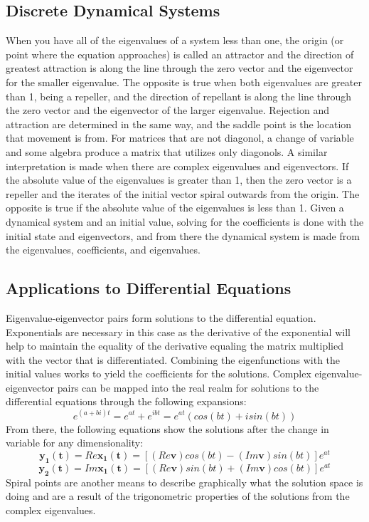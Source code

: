 \documentclass[12pt]{article}
\begin{document}
\subsection{Discrete Dynamical Systems}
When you have all of the eigenvalues of a system less than one, the origin (or point where the equation approaches) is called an attractor and the direction of greatest attraction is 
along the line through the zero vector and the eigenvector for the smaller eigenvalue. The opposite is true when both eigenvalues are greater than 1, being a repeller, and the 
direction of repellant is along the line through the zero vector and the eigenvector of the larger eigenvalue. Rejection and attraction are determined in the same way, and the saddle 
point is the location that movement is from. For matrices that are not diagonol, a change of variable and some algebra produce a matrix that utilizes only diagonols. A similar 
interpretation is made when there are complex eigenvalues and eigenvectors. If the absolute value of the eigenvalues is greater than 1, then the zero vector is a repeller and 
the iterates of the initial vector spiral outwards from the origin. The opposite is true if the absolute value of the eigenvalues is less than 1. Given a dynamical system 
and an initial value, solving for the coefficients is done with the initial state and eigenvectors, and from there the dynamical system is made from the eigenvalues, coefficients, 
and eigenvalues. 
\subsection{Applications to Differential Equations}
Eigenvalue-eigenvector pairs form solutions to the differential equation. Exponentials are necessary in this case as the derivative of the exponential will help to maintain the equality 
of the derivative equaling the matrix multiplied with the vector that is differentiated. Combining the eigenfunctions with the initial values works to yield the coefficients for the 
solutions. Complex eigenvalue-eigenvector pairs can be mapped into the real realm for solutions to the differential equations through the following expansions:
\newline
$$
e^{(a+bi)t}=e^{at}+e^{ibt}=e^{at}(cos(bt)+isin(bt))
$$
\newline
From there, the following equations show the solutions after the change in variable for any dimensionality:
\newline
$$
\mathbf{y_1(t)}=Re\mathbf{x_1(t)}=[(Re\mathbf{v})cos(bt)-(Im\mathbf{v})sin(bt)]e^{at}
$$
$$
\mathbf{y_2(t)}=Im\mathbf{x_1(t)}=[(Re\mathbf{v})sin(bt)+(Im\mathbf{v})cos(bt)]e^{at}
$$
\newline
Spiral points are another means to describe graphically what the solution space is doing and are a result of the trigonometric properties of the solutions from the complex eigenvalues. 
\end{document}
